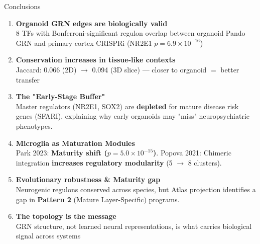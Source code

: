 \documentclass[aspectratio=169,11pt]{beamer}
\begin{document}
\begin{frame}{Conclusions}

\begin{enumerate}
    \item \textbf{Organoid GRN edges are biologically valid}\\
    {\small 8 TFs with Bonferroni-significant regulon overlap between organoid Pando GRN and primary cortex CRISPRi (NR2E1 $p=6.9\times 10^{-16}$)}

    \vspace{0.4em}
    \item \textbf{Conservation increases in tissue-like contexts}\\
    {\small Jaccard: 0.066 (2D) $\rightarrow$ 0.094 (3D slice) --- closer to organoid $=$ better transfer}

    \vspace{0.4em}
    \item \textbf{The "Early-Stage Buffer"}\\
    {\small Master regulators (NR2E1, SOX2) are \textbf{depleted} for mature disease risk genes (SFARI), explaining why early organoids may "miss" neuropsychiatric phenotypes.}

    \vspace{0.4em}
    \item \textbf{Microglia as Maturation Modules}\\
    {\small Park 2023: \textbf{Maturity shift ($p=5.0 \times 10^{-15}$)}. Popova 2021: Chimeric integration \textbf{increases regulatory modularity} (5 $\rightarrow$ 8 clusters).}

    \vspace{0.4em}
    \item \textbf{Evolutionary robustness \& Maturity gap}\\
    {\small Neurogenic regulons conserved across species, but Atlas projection identifies a gap in \textbf{Pattern 2} (Mature Layer-Specific) programs.}

    \vspace{0.4em}
    \item \textbf{The topology is the message}\\
    {\small GRN structure, not learned neural representations, is what carries biological signal across systems}
\end{enumerate}

\end{frame}

\end{document}
